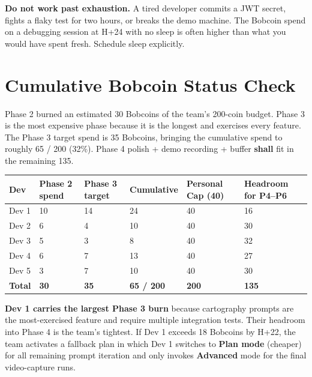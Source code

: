 \documentclass[11pt,letterpaper]{article}
\newcommand{\shall}{\textbf{shall}}
\begin{document}
\begin{warning}
\textbf{Do not work past exhaustion.} A tired developer commits a JWT secret, fights a flaky test for two hours, or breaks the demo machine. The Bobcoin spend on a debugging session at H+24 with no sleep is often higher than what you would have spent fresh. Schedule sleep explicitly.
\end{warning}

\section{Cumulative Bobcoin Status Check}

Phase 2 burned an estimated 30 Bobcoins of the team's 200-coin budget. Phase 3 is the most expensive phase because it is the longest and exercises every feature. The Phase 3 target spend is 35 Bobcoins, bringing the cumulative spend to roughly 65 / 200 (32\%). Phase 4 polish + demo recording + buffer \shall{} fit in the remaining 135.

\begin{longtable}{|p{1.4cm}|p{2.5cm}|p{2.2cm}|p{2.2cm}|p{2.0cm}|p{2.7cm}|}
\hline
\rowcolor{ibmblue!10}
\textbf{Dev} & \textbf{Phase 2 spend} & \textbf{Phase 3 target} & \textbf{Cumulative} & \textbf{Personal Cap (40)} & \textbf{Headroom for P4--P6} \\
\hline
Dev 1 & 10 & 14 & 24 & 40 & 16 \\
\hline
Dev 2 & 6 & 4 & 10 & 40 & 30 \\
\hline
Dev 3 & 5 & 3 & 8 & 40 & 32 \\
\hline
Dev 4 & 6 & 7 & 13 & 40 & 27 \\
\hline
Dev 5 & 3 & 7 & 10 & 40 & 30 \\
\hline
\rowcolor{ibmblue!5}
\textbf{Total} & \textbf{30} & \textbf{35} & \textbf{65 / 200} & \textbf{200} & \textbf{135} \\
\hline
\end{longtable}

\textbf{Dev 1 carries the largest Phase 3 burn} because cartography prompts are the most-exercised feature and require multiple integration tests. Their headroom into Phase 4 is the team's tightest. If Dev 1 exceeds 18 Bobcoins by H+22, the team activates a fallback plan in which Dev 1 switches to \textbf{Plan mode} (cheaper) for all remaining prompt iteration and only invokes \textbf{Advanced} mode for the final video-capture runs.
\end{document}
